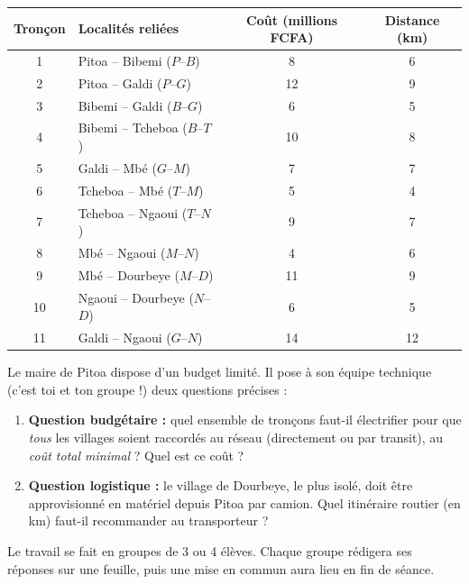 \documentclass[11pt]{article}
\newcounter{popsec}
\newcounter{popsub}
\newcommand{\courssub}[1]{%
  \stepcounter{popsub}%
  \par\vspace{9pt}\noindent{\popxbold\fontsize{11.5}{13}\selectfont\color{popink}{\color{poporange}\thepopsec.\thepopsub}\hspace{6pt}#1}\par\nopagebreak\vspace{4pt}
}
\begin{document}
\begin{center}
\begin{tabularx}{\linewidth}{|c|X|c|c|}
\hline
\rowcolor{popblueL} \textbf{Tronçon} & \textbf{Localités reliées} & \textbf{Coût (millions FCFA)} & \textbf{Distance (km)} \\
\hline
1 & Pitoa -- Bibemi ($P$--$B$) & 8 & 6 \\
\hline
2 & Pitoa -- Galdi ($P$--$G$) & 12 & 9 \\
\hline
3 & Bibemi -- Galdi ($B$--$G$) & 6 & 5 \\
\hline
4 & Bibemi -- Tcheboa ($B$--$T$) & 10 & 8 \\
\hline
5 & Galdi -- Mbé ($G$--$M$) & 7 & 7 \\
\hline
6 & Tcheboa -- Mbé ($T$--$M$) & 5 & 4 \\
\hline
7 & Tcheboa -- Ngaoui ($T$--$N$) & 9 & 7 \\
\hline
8 & Mbé -- Ngaoui ($M$--$N$) & 4 & 6 \\
\hline
9 & Mbé -- Dourbeye ($M$--$D$) & 11 & 9 \\
\hline
10 & Ngaoui -- Dourbeye ($N$--$D$) & 6 & 5 \\
\hline
11 & Galdi -- Ngaoui ($G$--$N$) & 14 & 12 \\
\hline
\end{tabularx}
\end{center}

Le maire de Pitoa dispose d'un budget limité. Il pose à son équipe technique (c'est toi et ton groupe !) deux questions précises :

\begin{enumerate}
\item \textbf{Question budgétaire :} quel ensemble de tronçons faut-il électrifier pour que \emph{tous} les villages soient raccordés au réseau (directement ou par transit), au \emph{coût total minimal} ? Quel est ce coût ?
\item \textbf{Question logistique :} le village de Dourbeye, le plus isolé, doit être approvisionné en matériel depuis Pitoa par camion. Quel itinéraire routier (en km) faut-il recommander au transporteur ?
\end{enumerate}

\courssub{Consignes}

Le travail se fait en groupes de 3 ou 4 élèves. Chaque groupe rédigera ses réponses sur une feuille, puis une mise en commun aura lieu en fin de séance.
\end{document}
